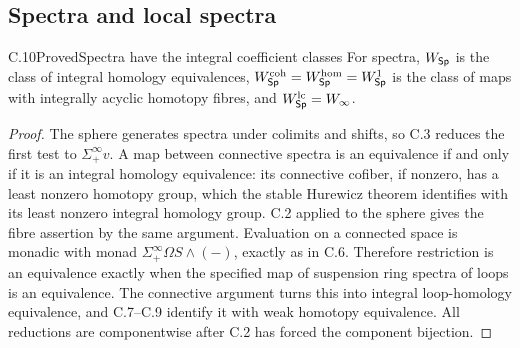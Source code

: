 \subsection{Spectra and local spectra}
\begin{claim}{C.10}{Proved}{Spectra have the integral coefficient classes}
For spectra, $W_{\mathsf{Sp}}$ is the class of integral homology equivalences,
$W_{\mathsf{Sp}}^{\mathrm{coh}}=W_{\mathsf{Sp}}^{\mathrm{hom}}=W_{\mathsf{Sp}}^1$ is the class of maps with integrally acyclic homotopy fibres, and $W_{\mathsf{Sp}}^{\mathrm{lc}}=W_\infty$.
\end{claim}
\begin{proof}
The sphere generates spectra under colimits and shifts, so C.3 reduces the first test to $\Sigma^\infty_+v$.  A map between connective spectra is an equivalence if and only if it is an integral homology equivalence: its connective cofiber, if nonzero, has a least nonzero homotopy group, which the stable Hurewicz theorem identifies with its least nonzero integral homology group.  C.2 applied to the sphere gives the fibre assertion by the same argument.  Evaluation on a connected space is monadic with monad $\Sigma^\infty_+\Omega S\wedge(-)$, exactly as in C.6.  Therefore restriction is an equivalence exactly when the specified map of suspension ring spectra of loops is an equivalence.  The connective argument turns this into integral loop-homology equivalence, and C.7--C.9 identify it with weak homotopy equivalence.  All reductions are componentwise after C.2 has forced the component bijection.
\end{proof}

